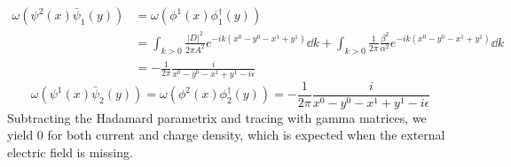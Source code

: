 \begin{equation*}
\begin{split}
\omega(\psi^2(x)\bar{\psi}_1(y)) & =  \omega(\phi^1(x)\phi^\dagger_1(y)) \\
& = \int_{k > 0} \frac{|D|^2}{2\pi A^2} e^{-ik(x^0 - y^0 - x^1 + y^1)} \dd k + \int_{k>0} \frac{1}{2\pi}  \frac{\beta^2}{\alpha^2} e^{-ik(x^0 - y^0 - x^1 + y^1)} \dd k\\
& = -\frac{1}{2\pi}\frac{i}{x^0 - y^0 - x^1 + y^1 - i\epsilon} 
\end{split}
\end{equation*}
\begin{equation*}
\omega(\psi^1(x)\bar{\psi}_2(y))   =  \omega(\phi^2(x)\phi^\dagger_2(y)) = -\frac{1}{2\pi}\frac{i}{x^0 - y^0 - x^1 + y^1 - i\epsilon} 
\end{equation*}
Subtracting the Hadamard parametrix and tracing with gamma matrices, we yield 0 for both current and charge density, which is expected when the external electric field is missing.





















